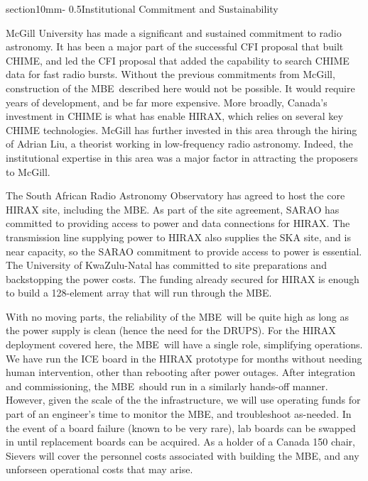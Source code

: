 \documentclass[letterpaper,11pt,preprint]{aastex}
\makeatletter
\newcommand{\mbe}{{\rm MBE}}
\renewcommand{\section}{\@startsection%
{section}{1}{0mm}{-\baselineskip}%
{0.5\baselineskip}{\normalfont\Large\bfseries}}%
\makeatother
\begin{document}
\section{Institutional Commitment and Sustainability}

McGill University has made a significant and sustained commitment to
radio astronomy.  It has been a major part of the successful CFI
proposal that built CHIME, and led the CFI proposal that added the
capability to search CHIME data for fast radio bursts.  Without the
previous commitments from McGill, construction of the \mbe\ described
here would not be possible.  It would require years of development,
and be far more expensive.  More broadly, Canada's investment in CHIME
is what has enable HIRAX, which relies on several key CHIME
technologies.  McGill has further invested in this area
through the hiring of Adrian Liu, a theorist working in low-frequency
radio astronomy.  Indeed, the institutional expertise in this area was
a major factor in attracting the proposers to McGill.  

The South African Radio Astronomy Observatory has agreed to host the
core HIRAX site, including the \mbe.  As part of the site agreement,
SARAO has committed to providing access to power and data connections
for HIRAX.  The transmission line supplying power to HIRAX also
supplies the SKA site, and is near capacity, so the SARAO commitment
to provide access to power is essential.  The University of
KwaZulu-Natal has committed to site preparations and  backstopping the
power costs.  The funding already secured for HIRAX is enough to build
a 128-element array that will run through the \mbe.  

With no moving parts, the reliability of the \mbe\ will be quite high
as long as the power supply is clean (hence the need for the DRUPS).
For the HIRAX deployment covered here, the \mbe\ will have a single
role, simplifying operations.  We have run the ICE board in the HIRAX
prototype for months without needing human intervention, other than
rebooting after power outages.  After integration and commissioning,
the \mbe\ should run in a similarly hands-off manner.  However, given
the scale of the the infrastructure, we will use operating funds for
part of an engineer's time to monitor the \mbe, and troubleshoot
as-needed.  In the event of a board failure (known to be very rare),
lab boards can be swapped in until replacement boards can be acquired.
As a holder of a Canada 150 chair, Sievers will cover the
personnel costs associated with building the \mbe, and any unforseen
operational costs that may arise.  
\end{document}

